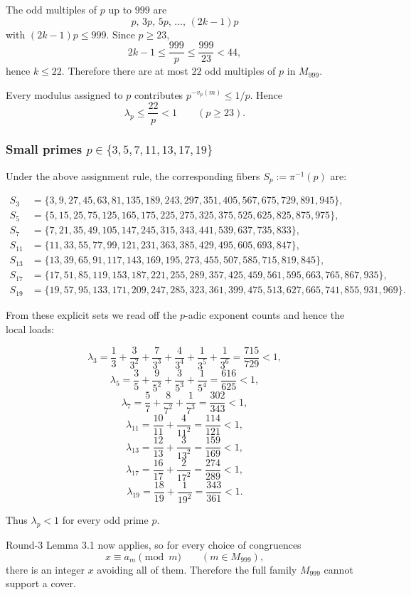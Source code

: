 The odd multiples of \(p\) up to \(999\) are
\[
p,\, 3p,\, 5p,\, \dots,\, (2k-1)p
\]
with \((2k-1)p\le 999\). Since \(p\ge 23\),
\[
2k-1 \le \frac{999}{p} \le \frac{999}{23} < 44,
\]
hence \(k\le 22\). Therefore there are at most \(22\) odd multiples of \(p\) in \(M_{999}\).

Every modulus assigned to \(p\) contributes \(p^{-v_p(m)}\le 1/p\). Hence
\[
\lambda_p \le \frac{22}{p} < 1
\qquad (p\ge 23).
\]

\subsubsection*{Small primes \(p\in\{3,5,7,11,13,17,19\}\)}
Under the above assignment rule, the corresponding fibers \(S_p:=\pi^{-1}(p)\) are:

\[
\begin{aligned}
S_3&=\{3,9,27,45,63,81,135,189,243,297,351,405,567,675,729,891,945\},\\
S_5&=\{5,15,25,75,125,165,175,225,275,325,375,525,625,825,875,975\},\\
S_7&=\{7,21,35,49,105,147,245,315,343,441,539,637,735,833\},\\
S_{11}&=\{11,33,55,77,99,121,231,363,385,429,495,605,693,847\},\\
S_{13}&=\{13,39,65,91,117,143,169,195,273,455,507,585,715,819,845\},\\
S_{17}&=\{17,51,85,119,153,187,221,255,289,357,425,459,561,595,663,765,867,935\},\\
S_{19}&=\{19,57,95,133,171,209,247,285,323,361,399,475,513,627,665,741,855,931,969\}.
\end{aligned}
\]

From these explicit sets we read off the \(p\)-adic exponent counts and hence the local loads:

\[
\lambda_3
= \frac{1}{3}+\frac{3}{3^2}+\frac{7}{3^3}+\frac{4}{3^4}+\frac{1}{3^5}+\frac{1}{3^6}
= \frac{715}{729}<1,
\]
\[
\lambda_5
= \frac{3}{5}+\frac{9}{5^2}+\frac{3}{5^3}+\frac{1}{5^4}
= \frac{616}{625}<1,
\]
\[
\lambda_7
= \frac{5}{7}+\frac{8}{7^2}+\frac{1}{7^3}
= \frac{302}{343}<1,
\]
\[
\lambda_{11}
= \frac{10}{11}+\frac{4}{11^2}
= \frac{114}{121}<1,
\]
\[
\lambda_{13}
= \frac{12}{13}+\frac{3}{13^2}
= \frac{159}{169}<1,
\]
\[
\lambda_{17}
= \frac{16}{17}+\frac{2}{17^2}
= \frac{274}{289}<1,
\]
\[
\lambda_{19}
= \frac{18}{19}+\frac{1}{19^2}
= \frac{343}{361}<1.
\]

Thus \(\lambda_p<1\) for every odd prime \(p\).

Round-3 Lemma 3.1 now applies, so for every choice of congruences
\[
x\equiv a_m \pmod m \qquad (m\in M_{999}),
\]
there is an integer \(x\) avoiding all of them. Therefore the full family \(M_{999}\) cannot support a cover.

